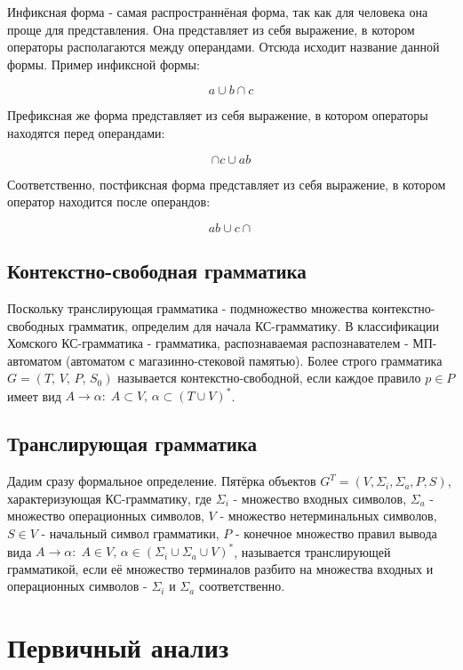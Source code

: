 \documentclass[12pt]{extarticle}
\begin{document}
\begin{sloppypar}
	Инфиксная форма - самая распространнёная форма, так как для человека она проще для представления. Она представляет из себя выражение, в котором операторы располагаются между операндами. Отсюда исходит название данной формы.
	Пример инфиксной формы:
	
	\[
		a \cup b \cap c
	\]
	
	Префиксная же форма представляет из себя выражение, в котором операторы находятся перед операндами:
	
	\[
		\cap c \cup ab
	\]
	
	Соответственно, постфиксная форма представляет из себя выражение, в котором оператор находится после операндов:
	
	\[
		ab \cup c \cap
	\]
	
	\subsection{Контекстно-свободная грамматика}
	
	Поскольку транслирующая грамматика - подмножество множества контекстно-свободных грамматик, определим для начала КС-грамматику. В классификации Хомского КС-грамматика - грамматика, распознаваемая распознавателем - МП-автоматом (автоматом с магазинно-стековой памятью). Более строго грамматика $G=(T, \, V, \, P, \, S_0)$ называется контекстно-свободной, если каждое правило $p \in P$ имеет вид $A \rightarrow \alpha : \; A \subset V, \, \alpha \subset (T \cup V)^*$.
	
	\subsection{Транслирующая грамматика}
	
	Дадим сразу формальное определение. Пятёрка объектов $G^T = (V, \Sigma_i, \Sigma_a, P, S)$, характеризующая КС-грамматику, где $\Sigma_i$ - множество входных символов, $\Sigma_a$ - множество операционных символов, $V$ - множество нетерминальных символов, $S \in V$ - начальный символ грамматики, $P$ - конечное множество правил вывода вида $A \rightarrow \alpha : \; A \in V, \, \alpha \in (\Sigma_i \cup \Sigma_a \cup V)^*$, называется транслирующей грамматикой, если её множество терминалов разбито на множества входных и операционных символов - $\Sigma_i$ и $\Sigma_a$ соответственно.
	
	\section{Первичный анализ}
	

\end{sloppypar}
\end{document}
